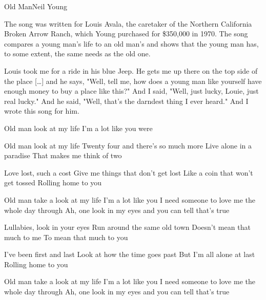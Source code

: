 \begin{Song}{Old Man}{Neil Young}

\begin{Paratext}
The song was written for Louis Avala, the caretaker of the Northern California Broken Arrow Ranch, which Young purchased for \$350,000 in 1970. The song compares a young man's life to an old man's and shows that the young man has, to some extent, the same needs as the old one.

\og Louis took me for a ride in his blue Jeep. He gets me up there on the top side of the place [\dots] and he says, "Well, tell me, how does a young man like yourself have enough money to buy a place like this?" And I said, "Well, just lucky, Louie, just real lucky." And he said, "Well, that's the darndest thing I ever heard." And I wrote this song for him.\fg
\end{Paratext}

\begin{multicols}{2}

\begin{Verse}
Old man look at my life
I'm a lot like you were
\bis
\espaceInterStrophe

Old man look at my life
Twenty four
and there's so much more
Live alone in a paradise
That makes me think of two
\espaceInterStrophe

Love lost, such a cost
Give me things
that don't get lost
Like a coin that won't get tossed
Rolling home to you
\end{Verse}
\espaceInterStrophe

\begin{Chorus}
Old man take a look at my life
I'm a lot like you
I need someone to love me
the whole day through
Ah, one look in my eyes
and you can tell that's true
\end{Chorus}
\espaceInterStrophe

\begin{Verse}
Lullabies, look in your eyes
Run around the same old town
Doesn't mean that much to me
To mean that much to you
\espaceInterStrophe

I've been first and last
Look at how the time goes past
But I'm all alone at last
Rolling home to you
\end{Verse}
\espaceInterStrophe

\begin{Chorus}
Old man take a look at my life
I'm a lot like you
I need someone to love me
the whole day through
Ah, one look in my eyes
and you can tell that's true
\end{Chorus}
\espaceInterStrophe


\end{multicols}
\end{Song}
